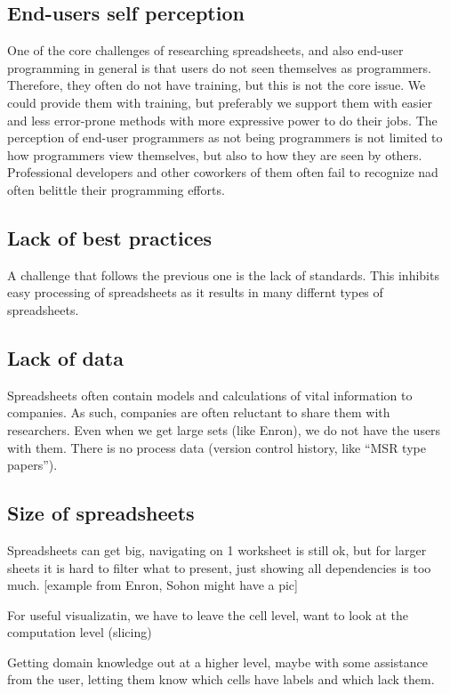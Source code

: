 \documentclass[conference]{IEEEtran}
\begin{document}
\subsection{End-users self perception}
One of the core challenges of researching spreadsheets, and also end-user programming in general is that users do not seen themselves as programmers. Therefore, they often do not have training, but this is not the core issue. We could provide them with training, but preferably we support them with easier and less error-prone methods with more expressive power to do their jobs.
The perception of end-user programmers as not being programmers is not limited to how programmers view themselves, but also to how they are seen by others. Professional developers and other coworkers of them often fail to recognize nad often belittle their programming efforts.

\subsection{Lack of best practices}
A challenge that follows the previous one is the lack of standards. This inhibits easy processing of spreadsheets as it results in many differnt types of spreadsheets.

\subsection{Lack of data}
Spreadsheets often contain models and calculations of vital information to companies. As such, companies are often reluctant to share them with researchers.  Even when we get large sets (like Enron), we do not have the users with them. There is no process data (version control history, like “MSR type papers”).

\subsection{Size of spreadsheets }
Spreadsheets can get big, navigating on 1 worksheet is still ok, but for larger sheets it is hard to filter what to present, just showing all dependencies is too much. [example from Enron, Sohon might have a pic]

For useful visualizatin, we have to leave the cell level, want to look at the computation level (slicing)

Getting domain knowledge out at a higher level, maybe with some assistance from the user, letting them know which cells have labels and which lack them.
\end{document}
